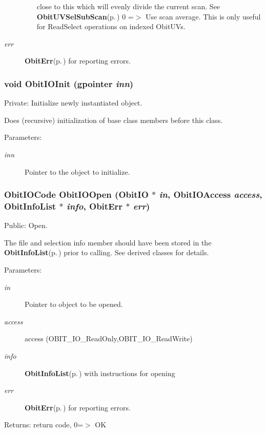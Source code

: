 \begin{Desc}
\begin{description}
\begin{itemize}
close to this which will evenly divide the current scan. See {\bf Obit\-UVSel\-Sub\-Scan}{\rm (p.\,\pageref{ObitUVSel_8c_a21})} 0 =$>$ Use scan average. This is only useful for Read\-Select operations on indexed Obit\-UVs. \end{itemize}
\item[{\em err}]{\bf Obit\-Err}{\rm (p.\,\pageref{structObitErr})} for reporting errors. \end{description}
\end{Desc}
\subsubsection{\setlength{\rightskip}{0pt plus 5cm}void Obit\-IOInit (gpointer {\em inn})}\label{ObitIO_8c_a3}


Private: Initialize newly instantiated object. 

Does (recursive) initialization of base class members before this class. \begin{Desc}
\item[Parameters:]
\begin{description}
\item[{\em inn}]Pointer to the object to initialize. \end{description}
\end{Desc}
\subsubsection{\setlength{\rightskip}{0pt plus 5cm}Obit\-IOCode Obit\-IOOpen ({\bf Obit\-IO} $\ast$ {\em in}, Obit\-IOAccess {\em access}, {\bf Obit\-Info\-List} $\ast$ {\em info}, {\bf Obit\-Err} $\ast$ {\em err})}\label{ObitIO_8c_a12}


Public: Open. 

The file and selection info member should have been stored in the {\bf Obit\-Info\-List}{\rm (p.\,\pageref{structObitInfoList})} prior to calling. See derived classes for details. \begin{Desc}
\item[Parameters:]
\begin{description}
\item[{\em in}]Pointer to object to be opened. \item[{\em access}]access (OBIT\_\-IO\_\-Read\-Only,OBIT\_\-IO\_\-Read\-Write) \item[{\em info}]{\bf Obit\-Info\-List}{\rm (p.\,\pageref{structObitInfoList})} with instructions for opening \item[{\em err}]{\bf Obit\-Err}{\rm (p.\,\pageref{structObitErr})} for reporting errors. \end{description}
\end{Desc}
\begin{Desc}
\item[Returns:]return code, 0=$>$ OK \end{Desc}
